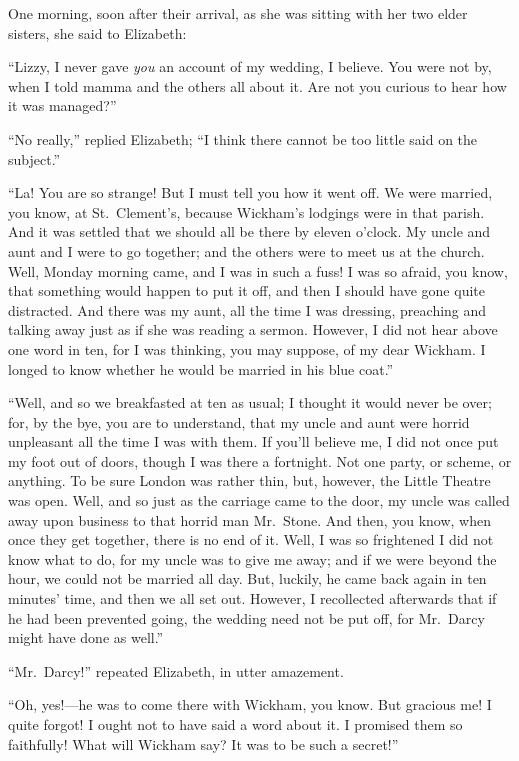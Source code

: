 One morning, soon after their arrival, as she was sitting with
her two elder sisters, she said to Elizabeth:

``Lizzy, I never gave \emph{you} an account of my wedding, I believe.
You were not by, when I told mamma and the others all about it.
Are not you curious to hear how it was managed?''

``No really,'' replied Elizabeth; ``I think there cannot be too
little said on the subject.''

``La!  You are so strange!  But I must tell you how it went off.
We were married, you know, at St.\ Clement's, because Wickham's
lodgings were in that parish.  And it was settled that we
should all be there by eleven o'clock.  My uncle and aunt and
I were to go together; and the others were to meet us at the
church.  Well, Monday morning came, and I was in such a fuss!
I was so afraid, you know, that something would happen to put
it off, and then I should have gone quite distracted.  And
there was my aunt, all the time I was dressing, preaching and
talking away just as if she was reading a sermon.  However, I
did not hear above one word in ten, for I was thinking, you may
suppose, of my dear Wickham.  I longed to know whether he would
be married in his blue coat.''

``Well, and so we breakfasted at ten as usual; I thought it
would never be over; for, by the bye, you are to understand,
that my uncle and aunt were horrid unpleasant all the time I
was with them.  If you'll believe me, I did not once put my
foot out of doors, though I was there a fortnight.  Not one
party, or scheme, or anything.  To be sure London was rather
thin, but, however, the Little Theatre was open.  Well, and so
just as the carriage came to the door, my uncle was called away
upon business to that horrid man Mr.\ Stone.  And then, you
know, when once they get together, there is no end of it.
Well, I was so frightened I did not know what to do, for my
uncle was to give me away; and if we were beyond the hour, we
could not be married all day.  But, luckily, he came back again
in ten minutes' time, and then we all set out.  However, I
recollected afterwards that if he had been prevented going,
the wedding need not be put off, for Mr.\ Darcy might have done
as well.''

``Mr.\ Darcy!'' repeated Elizabeth, in utter amazement.

``Oh, yes!---he was to come there with Wickham, you know.  But
gracious me!  I quite forgot!  I ought not to have said a word
about it.  I promised them so faithfully!  What will Wickham
say?  It was to be such a secret!''


